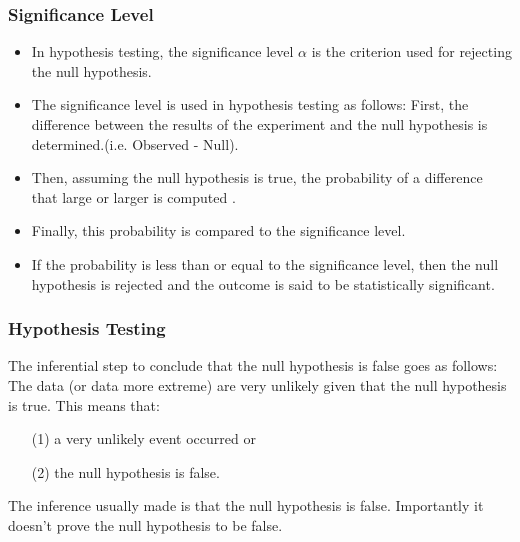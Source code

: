 \begin{frame}
\frametitle{Significance Level}

\begin{itemize}
\item In hypothesis testing, the significance level $\alpha$ is the criterion used for rejecting the null hypothesis. \item The significance level is used in hypothesis testing as follows: First, the difference between the results of the experiment and the null hypothesis is determined.(i.e. Observed - Null). \item Then, assuming the null hypothesis is true, the probability of a difference that large or larger is computed . \item Finally, this probability is compared to the significance level.\item  If the probability is less than or equal to the significance level, then the null hypothesis is rejected and the outcome is said to be statistically significant.
\end{itemize}
\end{frame}

\begin{frame}
\frametitle{Hypothesis Testing}
The inferential step to conclude that the null hypothesis is false goes as follows: The data (or data more extreme) are very unlikely given that the null hypothesis is true.
\bigskip
This means that:
\begin{itemize}
\item[(1)] a very unlikely event occurred or
\item[(2)] the null hypothesis is false.
\end{itemize}
\bigskip
The inference usually made is that the null hypothesis is false. Importantly it doesn't prove the null hypothesis to be false.
\end{frame}


